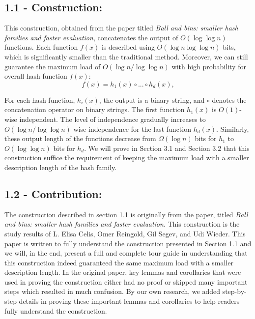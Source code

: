\documentclass[a4paper, english]{paper}
\begin{document}
	\subsection{1.1 - Construction:}
	This construction, obtained from the paper  titled \textit{Ball and bins: smaller hash families and faster evaluation}, concatenates the output of  $O(\log \log n)$ functions. Each function $f(x)$ is described using $O(\log n \log\log n)$ bits, which is significantly smaller than the traditional method. Moreover, we can still guarantee the maximum load of $O(\log n/ \log \log n)$ with high probability for overall hash function $f(x)$:
			$$f(x) = h_1(x) \circ ... \circ h_d(x),$$\par
 For each hash function, $h_i(x)$, the output is a binary string, and $\circ$ denotes the concatenation operator on binary strings. The first function $h_1(x)$ is $O(1)$-wise independent. The level of independence gradually increases to $O(\log n/ \log \log n)$-wise independence for the last function $h_d(x)$. Similarly, these output length of the functions decrease from $\Omega(\log n)$ bits for $h_1$ to $O(\log\log n)$ bits for $h_d$. We will prove in Section 3.1 and Section 3.2 that this construction suffice the requirement of keeping the maximum load with a smaller description length of the hash family. \\
	
	\subsection{1.2 - Contribution:} 
	The construction described in section 1.1 is originally from the paper, titled \textit{Ball and bins: smaller hash families and faster evaluation}. This construction is the study results of L. Elisa Celis, Omer Reingold, Gil Segev, and Udi Wieder. This paper is written to fully understand the construction presented in Section 1.1 and we will, in the end, present a full and complete tour guide in understanding that this construction indeed guaranteed the same maximum load with a smaller description length. In the original paper, key lemmas and corollaries that were used in proving the construction either had no proof or skipped many important steps which resulted in much confusion. By our own research, we added step-by-step details in proving these important lemmas and corollaries to help readers fully understand the construction. \\
		
\end{document}
